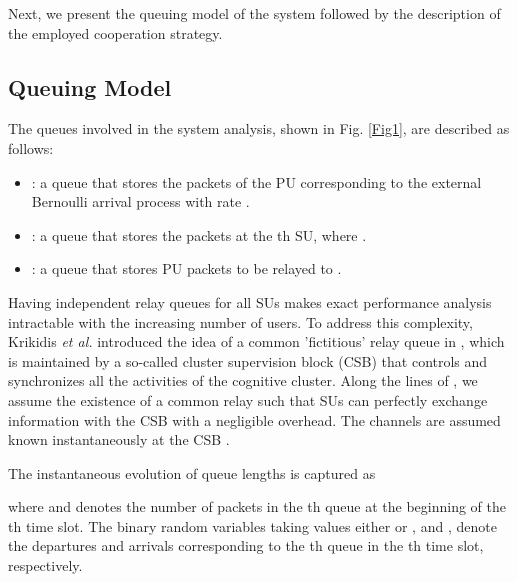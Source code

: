 \documentclass[journal,twocolumn]{IEEEtran}
\begin{document}
Next, we present the queuing model of the system followed by the description of the employed cooperation strategy.

\subsection{Queuing Model}
The queues involved in the system analysis, shown in Fig. \ref{Fig1}, are described as follows:
\begin{itemize}
\item : a queue that stores the packets of the PU corresponding to the external Bernoulli arrival process with rate .

\item : a queue that stores the packets at the th SU, where .

\item : a queue that stores PU packets to be relayed to .
\end{itemize}
Having independent relay queues for all SUs makes exact performance analysis intractable with the increasing number of users. To address this complexity, Krikidis \emph{et al.} introduced the idea of a common 'fictitious' relay queue  in \cite{Krikidis}, which is maintained by a so-called cluster supervision block (CSB) that controls and synchronizes all the activities of the cognitive cluster.
Along the lines of  \cite{Krikidis}, we assume the existence of a common relay such that SUs can perfectly exchange information with the CSB with a negligible overhead. The channels  are assumed known instantaneously at the CSB \cite{Krikidis,jovicic}.

The instantaneous evolution of queue lengths is captured as

where  and  denotes the number of packets in the th queue at the beginning of the th time slot. The
binary random variables taking values either  or ,  and , denote the departures and arrivals corresponding to the
th queue in the th time slot, respectively.
\end{document}
